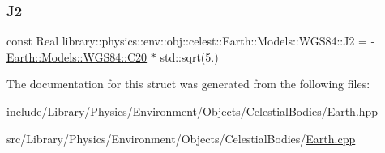 \subsubsection{\texorpdfstring{J2}{J2}}
{\footnotesize\ttfamily const Real library\+::physics\+::env\+::obj\+::celest\+::\+Earth\+::\+Models\+::\+W\+G\+S84\+::\+J2 = -\/\hyperlink{structlibrary_1_1physics_1_1env_1_1obj_1_1celest_1_1_earth_1_1_models_1_1_w_g_s84_a10f72d2266521d5f5303e9a1ace4c492}{Earth\+::\+Models\+::\+W\+G\+S84\+::\+C20} $\ast$ std\+::sqrt(5.)\hspace{0.3cm}{\ttfamily [static]}}



The documentation for this struct was generated from the following files\+:\begin{DoxyCompactItemize}
\item 
include/\+Library/\+Physics/\+Environment/\+Objects/\+Celestial\+Bodies/\hyperlink{_objects_2_celestial_bodies_2_earth_8hpp}{Earth.\+hpp}\item 
src/\+Library/\+Physics/\+Environment/\+Objects/\+Celestial\+Bodies/\hyperlink{_objects_2_celestial_bodies_2_earth_8cpp}{Earth.\+cpp}\end{DoxyCompactItemize}
